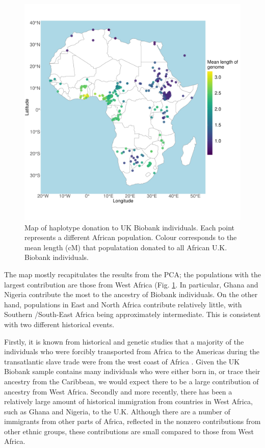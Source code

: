 \begin{figure}[htp]
    \centering
    \includegraphics[width=1.0\textwidth]{../images/chapter3/haplotype_sharing_map.pdf}
    \caption{Map of haplotype donation to UK Biobank individuals. Each point represents a different African population. Colour corresponds to the mean length (cM) that populatation donated to all African U.K. Biobank individuals.}
    \label{fig:haplotype_sharing_map_zoomed_II}
\end{figure}

The map mostly recapitulates the results from the PCA; the populations with the largest contribution are those from West Africa (Fig. \ref{fig:haplotype_sharing_map_zoomed_II}. In particular, Ghana and Nigeria contribute the most to the ancestry of Biobank individuals. On the other hand, populations in East and North Africa contribute relatively little, with Southern /South-East Africa being approximately intermediate. This is consistent with two different historical events. 

Firstly, it is known from historical and genetic studies that a majority of the individuals who were forcibly transported from Africa to the Americas during the transatlantic slave trade were from the west coast of Africa \cite{micheletti2020genetic}. Given the UK Biobank sample contains many individuals who were either born in, or trace their ancestry from the Caribbean, we would expect there to be a large contribution of ancestry from West Africa. Secondly and more recently, there has been a relatively large amount of historical immigration from countries in West Africa, such as Ghana and Nigeria, to the U.K. Although there are a number of immigrants from other parts of Africa, reflected in the nonzero contributions from other ethnic groups, these contributions are small compared to those from West Africa.

